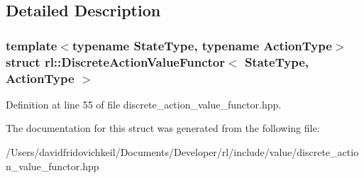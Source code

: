 \subsection{Detailed Description}
\subsubsection*{template$<$typename State\+Type, typename Action\+Type$>$\newline
struct rl\+::\+Discrete\+Action\+Value\+Functor$<$ State\+Type, Action\+Type $>$}



Definition at line 55 of file discrete\+\_\+action\+\_\+value\+\_\+functor.\+hpp.



The documentation for this struct was generated from the following file\+:\begin{DoxyCompactItemize}
\item 
/\+Users/davidfridovichkeil/\+Documents/\+Developer/rl/include/value/discrete\+\_\+action\+\_\+value\+\_\+functor.\+hpp\end{DoxyCompactItemize}
